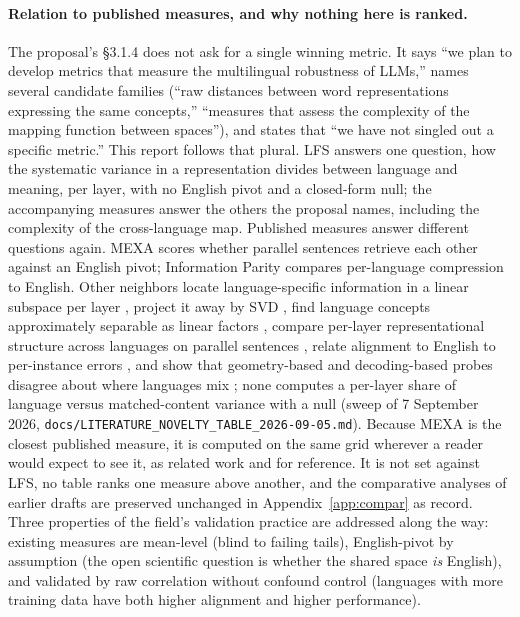 \documentclass[11pt,a4paper]{article}
\begin{document}
\paragraph{Relation to published measures, and why nothing here is ranked.}
The proposal's \S3.1.4 does not ask for a single winning metric. It says
``we plan to develop metrics that measure the multilingual robustness of
LLMs,'' names several candidate families (``raw distances between word
representations expressing the same concepts,'' ``measures that assess the
complexity of the mapping function between spaces''), and states that ``we
have not singled out a specific metric.'' This report follows that plural.
LFS answers one question, how the systematic variance in a representation
divides between language and meaning, per layer, with no English pivot and a
closed-form null; the accompanying measures answer the others the proposal
names, including the complexity of the cross-language map. Published
measures answer different questions again. MEXA \citep[ACL Findings
2025]{kargaran2024mexa} scores whether parallel sentences retrieve each
other against an English pivot; Information Parity \citep{tsvetkov2024ip}
compares per-language compression to English. Other neighbors locate
language-specific information in a linear subspace per layer
\citep{liang2021locating}, project it away by SVD \citep{xie2022lowrank},
find language concepts approximately separable as linear factors
\citep{marinov2026separability}, compare per-layer representational structure
across languages on parallel sentences \citep{sakajo2026structural}, relate
alignment to English to per-instance errors \citep{ravisankar2025map}, and
show that geometry-based and decoding-based probes disagree about where
languages mix \citep{bayazit2026lingua}; none computes a per-layer share of
language versus matched-content variance with a null (sweep of 7 September
2026, \texttt{docs/LITERATURE\_NOVELTY\_TABLE\_2026-09-05.md}). Because MEXA is the closest
published measure, it is computed on the same grid wherever a reader would
expect to see it, as related work and for reference. It is not set against LFS,
no table ranks one measure above another, and the comparative analyses of
earlier drafts are preserved unchanged in Appendix~\ref{app:compar} as
record. Three properties of the field's validation practice are addressed
along the way: existing measures are mean-level (blind to failing tails),
English-pivot by assumption (the open scientific question is whether the
shared space \emph{is} English), and validated by raw correlation without
confound control (languages with more training data have both higher
alignment and higher performance).
\end{document}
